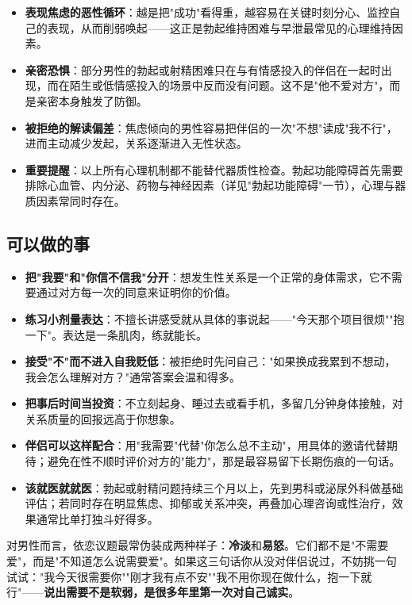 \begin{itemize}
	\item \textbf{表现焦虑的恶性循环}：越是把"成功"看得重，越容易在关键时刻分心、监控自己的表现，从而削弱唤起——这正是勃起维持困难与早泄最常见的心理维持因素。
	\item \textbf{亲密恐惧}：部分男性的勃起或射精困难只在与有情感投入的伴侣在一起时出现，而在陌生或低情感投入的场景中反而没有问题。这不是"他不爱对方"，而是亲密本身触发了防御。
	\item \textbf{被拒绝的解读偏差}：焦虑倾向的男性容易把伴侣的一次"不想"读成"我不行"，进而主动减少发起，关系逐渐进入无性状态。
	\item \textbf{重要提醒}：以上所有心理机制都不能替代器质性检查。勃起功能障碍首先需要排除心血管、内分泌、药物与神经因素（详见"勃起功能障碍"一节），心理与器质因素常同时存在。
\end{itemize}

\subsection{可以做的事}

\begin{itemize}
	\item \textbf{把"我要"和"你信不信我"分开}：想发生性关系是一个正常的身体需求，它不需要通过对方每一次的同意来证明你的价值。
	\item \textbf{练习小剂量表达}：不擅长讲感受就从具体的事说起——"今天那个项目很烦""抱一下"。表达是一条肌肉，练就能长。
	\item \textbf{接受"不"而不进入自我贬低}：被拒绝时先问自己："如果换成我累到不想动，我会怎么理解对方？"通常答案会温和得多。
	\item \textbf{把事后时间当投资}：不立刻起身、睡过去或看手机，多留几分钟身体接触，对关系质量的回报远高于你想象。
	\item \textbf{伴侣可以这样配合}：用"我需要"代替"你怎么总不主动"，用具体的邀请代替期待；避免在性不顺时评价对方的"能力"，那是最容易留下长期伤痕的一句话。
	\item \textbf{该就医就就医}：勃起或射精问题持续三个月以上，先到男科或泌尿外科做基础评估；若同时存在明显焦虑、抑郁或关系冲突，再叠加心理咨询或性治疗，效果通常比单打独斗好得多。
\end{itemize}

\begin{tcolorbox}[colback=pink!5!white,colframe=red!50!black,title=贴心小叮咛]
对男性而言，依恋议题最常伪装成两种样子：\textbf{冷淡}和\textbf{易怒}。它们都不是"不需要爱"，而是"不知道怎么说需要爱"。如果这三句话你从没对伴侣说过，不妨挑一句试试："我今天很需要你""刚才我有点不安""我不用你现在做什么，抱一下就行"——\textbf{说出需要不是软弱，是很多年里第一次对自己诚实}。
\end{tcolorbox}

